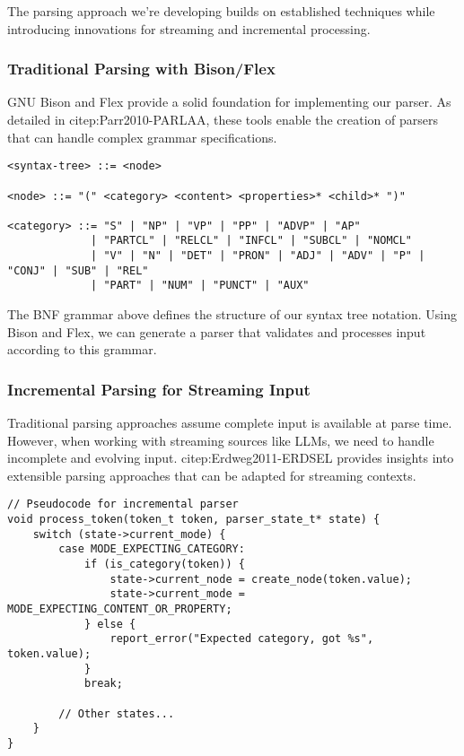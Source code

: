 \documentclass[a4paper,11pt]{article}
\begin{document}
The parsing approach we're developing builds on established techniques while introducing innovations for streaming and incremental processing.
\subsubsection{Traditional Parsing with Bison/Flex}
\label{sec:org72c4602}

GNU Bison and Flex provide a solid foundation for implementing our parser. As detailed in citep:Parr2010-PARLAA, these tools enable the creation of parsers that can handle complex grammar specifications.

\begin{verbatim}
<syntax-tree> ::= <node>

<node> ::= "(" <category> <content> <properties>* <child>* ")"

<category> ::= "S" | "NP" | "VP" | "PP" | "ADVP" | "AP" 
             | "PARTCL" | "RELCL" | "INFCL" | "SUBCL" | "NOMCL"
             | "V" | "N" | "DET" | "PRON" | "ADJ" | "ADV" | "P" | "CONJ" | "SUB" | "REL"
             | "PART" | "NUM" | "PUNCT" | "AUX"
\end{verbatim}

The BNF grammar above defines the structure of our syntax tree notation. Using Bison and Flex, we can generate a parser that validates and processes input according to this grammar.
\subsubsection{Incremental Parsing for Streaming Input}
\label{sec:org76588d1}

Traditional parsing approaches assume complete input is available at parse time. However, when working with streaming sources like LLMs, we need to handle incomplete and evolving input. citep:Erdweg2011-ERDSEL provides insights into extensible parsing approaches that can be adapted for streaming contexts.

\begin{verbatim}
// Pseudocode for incremental parser
void process_token(token_t token, parser_state_t* state) {
    switch (state->current_mode) {
        case MODE_EXPECTING_CATEGORY:
            if (is_category(token)) {
                state->current_node = create_node(token.value);
                state->current_mode = MODE_EXPECTING_CONTENT_OR_PROPERTY;
            } else {
                report_error("Expected category, got %s", token.value);
            }
            break;

        // Other states...
    }
}
\end{verbatim}
\end{document}
